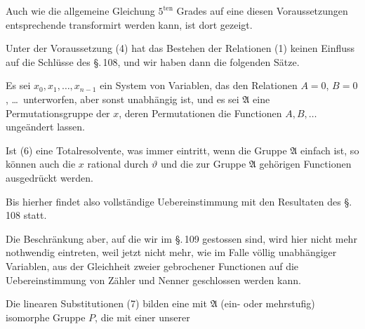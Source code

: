 Auch wie die allgemeine Gleichung $5^{\mathrm{ten}}$ Grades auf eine diesen Voraussetzungen entsprechende transformirt werden kann, ist dort gezeigt.

Unter der Voraussetzung (4) hat das Bestehen der Relationen (1) keinen Einfluss auf die Schlüsse des \S.\,108, und wir haben dann die folgenden Sätze.

Es sei $x_0, x_1, \ldots, x_{n-1}$ ein System von Variablen, das den Relationen $A=0$, $B=0$, \ldots\ unterworfen, aber sonst unabhängig ist, und es sei $\mathfrak{A}$ eine Permutationsgruppe der $x$, deren Permutationen die Functionen $A, B, \ldots$ ungeändert lassen.


Ist (6) eine Totalresolvente, was immer eintritt, wenn die Gruppe $\mathfrak{A}$ einfach ist, so können auch die $x$ rational durch $\vartheta$ und die zur Gruppe $\mathfrak{A}$ gehörigen Functionen ausgedrückt werden.

Bis hierher findet also vollständige Uebereinstimmung mit den Resultaten des \S.\,108 statt.

Die Beschränkung aber, auf die wir im \S.\,109 gestossen sind, wird hier nicht mehr nothwendig eintreten, weil jetzt nicht mehr, wie im Falle völlig unabhängiger Variablen, aus der Gleichheit zweier gebrochener Functionen auf die Uebereinstimmung von Zähler und Nenner geschlossen werden kann.

Die linearen Substitutionen (7) bilden eine mit $\mathfrak{A}$ (ein- oder mehrstufig) isomorphe Gruppe $P$, die mit einer unserer
